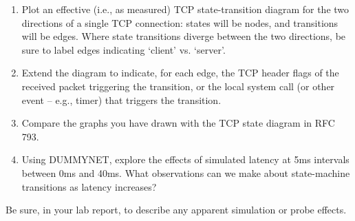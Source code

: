 \documentclass[a4paper,10pt]{article}
\begin{document}
\begin{enumerate}
  \item Plot an effective (i.e., as measured) TCP state-transition diagram for
    the two directions of a single TCP connection: states will be nodes, and
    transitions will be edges.
    Where state transitions diverge between the two directions, be sure to
    label edges indicating `client' vs. `server'.

  \item Extend the diagram to indicate, for each edge, the TCP header flags
    of the received packet triggering the transition, or the local system call
    (or other event -- e.g., timer) that triggers the transition.

  \item Compare the graphs you have drawn with the TCP state diagram in RFC
    793.

  \item Using DUMMYNET, explore the effects of simulated latency at 5ms
    intervals between 0ms and 40ms.
    What observations can we make about state-machine transitions as latency
    increases?
\end{enumerate}

\noindent
Be sure, in your lab report, to describe any apparent simulation or probe
effects.
\end{document}
